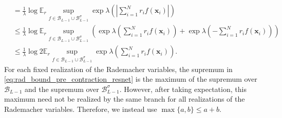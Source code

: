 \documentclass{article}
\def\vx{{\bm{x}}}
\def\cB{{\mathcal{B}}}
\def\bE{{\mathbb{E}}}
\begin{document}
\begin{appendices}
\begin{align}
        &= \frac{1}{\lambda} \log \bE_r \sup_{f \in \cB_{L-1} \cup \cB_{L-1}^\sigma} \exp \lambda \left( \left| \sum_{i=1}^N r_i f(\vx_i) \right| \right) \\
        &\leq \frac{1}{\lambda} \log \bE_r \sup_{f \in \cB_{L-1} \cup \cB_{L-1}^\sigma} \left( \exp \lambda \left( \sum_{i=1}^N r_i f(\vx_i)  \right) + \exp \lambda \left( -\sum_{i=1}^N r_i f(\vx_i) \right)\right) \\
        &\leq \frac{1}{\lambda} \log 2 \bE_r \sup_{f \in \cB_{L-1} \cup \cB_{L-1}^\sigma} \exp \lambda \left( \sum_{i=1}^N r_i f(\vx_i) \right). \label{eq:rad_bound_pre_contraction_resnet}
    \end{align}
    For each fixed realization of the Rademacher variables, the supremum in \eqref{eq:rad_bound_pre_contraction_resnet} is the maximum of the supremum over $\cB_{L-1}$ and the supremum over $\cB_{L-1}^\sigma$. However, after taking expectation, this maximum need not be realized by the same branch for all realizations of the Rademacher variables. Therefore, we instead use $\max\{a,b\} \leq a+b$.


\end{appendices}
\end{document}
